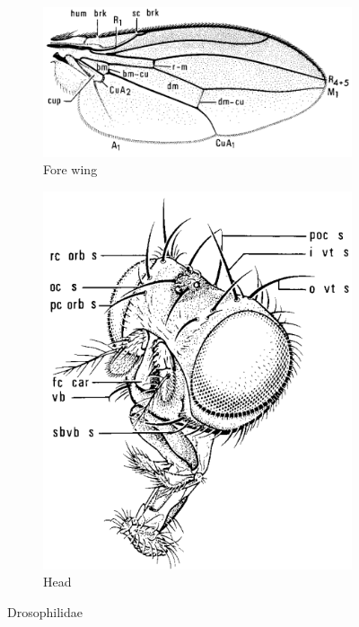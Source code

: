 \documentclass[letterpaper, 11pt]{article}
\begin{document}
\begin{figure}[ht!]
    \centering
    \begin{subfigure}[ht!]{0.5\textwidth}
        \includegraphics[width=\textwidth]{DrosophilidWing}
        \caption{Fore wing \citep[][Fig. 95.6]{mcalpine1981manualv2}}
        \label{fig:drosophilid1}
    \end{subfigure}
    \qquad
    \begin{subfigure}[ht!]{0.27\textwidth}
        \includegraphics[width=\textwidth]{DrosophilidHead}
        \caption{Head \citep[][Fig. 95.6]{mcalpine1981manualv2}}
        \label{fig:drosophilid2}
    \end{subfigure}
    \caption{Drosophilidae}\label{fig:drosophilids}
\end{figure}
\end{document}
